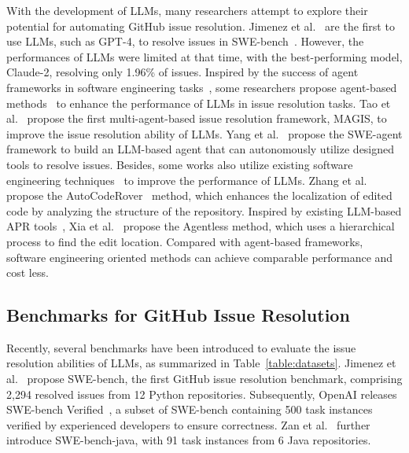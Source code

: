 With the development of LLMs, many researchers attempt to explore their potential for automating GitHub issue resolution. Jimenez et al.~\cite{jimenez2023swe} are the first to use LLMs, such as GPT-4, to resolve issues in SWE-bench~\cite{jimenez2023swe}. However, the performances of LLMs were limited at that time, with the best-performing model, Claude-2, resolving only 1.96\% of issues. Inspired by the success of agent frameworks in software engineering tasks~\cite{huang2024agents,liu2024large,feldt2023towards}, some researchers propose agent-based methods~\cite{tao2024magis,zhang2024autocoderover,yang2024swe,chen2024coder,liu2024marscode,wang2024opendevin,bouzenia2024repairagent,ruan2024specrover,zhang2024diversity} to enhance the performance of LLMs in issue resolution tasks. Tao et al.~\cite{tao2024magis} propose the first multi-agent-based issue resolution framework, MAGIS, to improve the issue resolution ability of LLMs. Yang et al.~\cite{yang2024swe} propose the SWE-agent framework to build an LLM-based agent that can autonomously utilize designed tools to resolve issues. Besides, some works also utilize existing software engineering techniques~\cite{wong2016survey,jones2005empirical,lou2020can} to improve the performance of LLMs. Zhang et al. propose the AutoCodeRover~\cite{zhang2024autocoderover} method, which enhances the localization of edited code by analyzing the structure of the repository.  Inspired
by existing LLM-based APR tools~\cite{xia2023automated,xia2023keep,bouzenia2024repairagent,hidvegi2024cigar,chen2024flakiness,zhang2024acfix}, Xia et al.~\cite{xia2024agentless} propose the Agentless method, which uses a hierarchical process to find the edit location. Compared with agent-based frameworks, software engineering oriented methods can achieve comparable performance and cost less.


\subsection{Benchmarks for GitHub Issue Resolution}
Recently, several benchmarks have been introduced to evaluate the issue resolution abilities of LLMs, as summarized in Table~\ref{table:datasets}. Jimenez et al.~\cite{jimenez2023swe} propose SWE-bench, the first GitHub issue resolution benchmark, comprising 2,294 resolved issues from 12 Python repositories. Subsequently, OpenAI releases SWE-bench Verified~\cite{openai2024swe}, a subset of SWE-bench containing 500 task instances verified by experienced developers to ensure correctness. Zan et al.~\cite{zan2024swe} further introduce SWE-bench-java, with 91 task instances from 6 Java repositories. 

